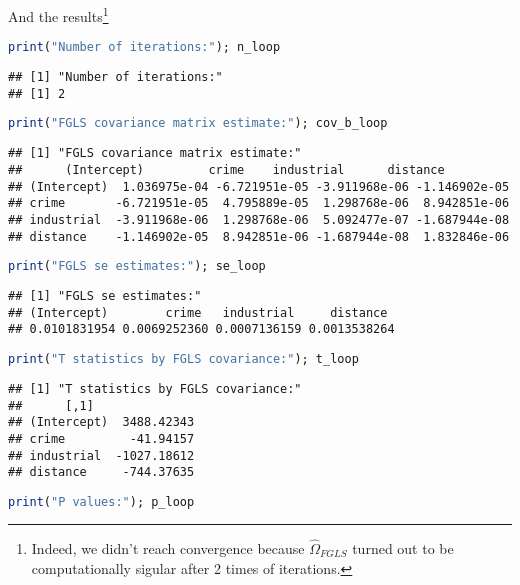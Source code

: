 \documentclass{article}
\theoremstyle{definition}
\begin{document}
And the results\footnote{Indeed, we didn't reach convergence because $\widehat{\Omega}_{FGLS}$ turned out to be computationally sigular after 2 times of iterations.}\\

\begin{lstlisting}[language = R]
print("Number of iterations:"); n_loop
\end{lstlisting}

\begin{Verbatim}
## [1] "Number of iterations:"
## [1] 2
\end{Verbatim}

\begin{lstlisting}[language = R]
print("FGLS covariance matrix estimate:"); cov_b_loop
\end{lstlisting}

\begin{Verbatim}
## [1] "FGLS covariance matrix estimate:"
## 	    (Intercept)         crime    industrial      distance
## (Intercept)  1.036975e-04 -6.721951e-05 -3.911968e-06 -1.146902e-05
## crime       -6.721951e-05  4.795889e-05  1.298768e-06  8.942851e-06
## industrial  -3.911968e-06  1.298768e-06  5.092477e-07 -1.687944e-08
## distance    -1.146902e-05  8.942851e-06 -1.687944e-08  1.832846e-06
\end{Verbatim}

\begin{lstlisting}[language = R]
print("FGLS se estimates:"); se_loop
\end{lstlisting}

\begin{Verbatim}
## [1] "FGLS se estimates:"
## (Intercept)        crime   industrial     distance 
## 0.0101831954 0.0069252360 0.0007136159 0.0013538264 
\end{Verbatim}

\begin{lstlisting}[language = R]
print("T statistics by FGLS covariance:"); t_loop
\end{lstlisting}

\begin{Verbatim}
## [1] "T statistics by FGLS covariance:"
## 		[,1]
## (Intercept)  3488.42343
## crime         -41.94157
## industrial  -1027.18612
## distance     -744.37635
\end{Verbatim}

\begin{lstlisting}[language = R]
print("P values:"); p_loop
\end{lstlisting}
\end{document}
